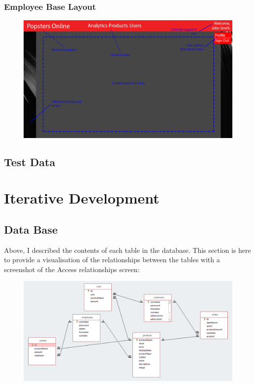 ﻿\documentclass{article}
\begin{document}
    \paragraph{}

    \newpage
    \subsubsection{Employee Base Layout}
    \begin{figure}[h]
        \includegraphics[width=\textwidth]{employeeBasic.png}
        \centering
    \end{figure}
    \paragraph{}

    \subsection{Test Data}
    
    
    \section{Iterative Development}
    \subsection{Data Base}
    Above, I described the contents of each table in the database.
    This section is here to provide a visualisation of the relationships between the tables with a screenshot of the Access relationships screen:
    \begin{figure}
        \centering
        \includegraphics[width=\textwidth]{dataBaseScreen.png}
    \end{figure}
\end{document}

